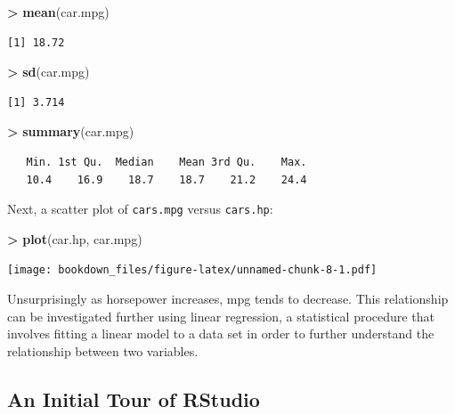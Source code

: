 \documentclass[]{krantz}
\makeatletter
\newenvironment{Shaded}{\begin{snugshade}}{\end{snugshade}}
\newcommand{\KeywordTok}[1]{\textcolor[rgb]{0.27,0.27,0.27}{\textbf{#1}}}
\newcommand{\StringTok}[1]{\textcolor[rgb]{0.5,0.5,0.5}{#1}}
\newcommand{\OperatorTok}[1]{\textcolor[rgb]{0.43,0.43,0.43}{\textbf{#1}}}
\newcommand{\NormalTok}[1]{#1}
\newenvironment{kframe}{%
\medskip{}
\setlength{\fboxsep}{.8em}
 \def\at@end@of@kframe{}%
 \ifinner\ifhmode%
  \def\at@end@of@kframe{\end{minipage}}%
  \begin{minipage}{\columnwidth}%
 \fi\fi%
 \def\FrameCommand##1{\hskip\@totalleftmargin \hskip-\fboxsep
 \colorbox{shadecolor}{##1}\hskip-\fboxsep
     \hskip-\linewidth \hskip-\@totalleftmargin \hskip\columnwidth}%
 \MakeFramed {\advance\hsize-\width
   \@totalleftmargin\z@ \linewidth\hsize
   \@setminipage}}%
 {\par\unskip\endMakeFramed%
 \at@end@of@kframe}
\renewenvironment{Shaded}{\begin{kframe}}{\end{kframe}}
\makeatother
\begin{document}
\begin{Shaded}
\begin{Highlighting}[]
\OperatorTok{>}\StringTok{ }\KeywordTok{mean}\NormalTok{(car.mpg)}
\end{Highlighting}
\end{Shaded}

\begin{verbatim}
[1] 18.72
\end{verbatim}

\begin{Shaded}
\begin{Highlighting}[]
\OperatorTok{>}\StringTok{ }\KeywordTok{sd}\NormalTok{(car.mpg)}
\end{Highlighting}
\end{Shaded}

\begin{verbatim}
[1] 3.714
\end{verbatim}

\begin{Shaded}
\begin{Highlighting}[]
\OperatorTok{>}\StringTok{ }\KeywordTok{summary}\NormalTok{(car.mpg)}
\end{Highlighting}
\end{Shaded}

\begin{verbatim}
   Min. 1st Qu.  Median    Mean 3rd Qu.    Max. 
   10.4    16.9    18.7    18.7    21.2    24.4 
\end{verbatim}

Next, a scatter plot of \texttt{cars.mpg} versus \texttt{cars.hp}:

\begin{Shaded}
\begin{Highlighting}[]
\OperatorTok{>}\StringTok{ }\KeywordTok{plot}\NormalTok{(car.hp, car.mpg)}
\end{Highlighting}
\end{Shaded}

\texttt{[image: bookdown\_files/figure-latex/unnamed-chunk-8-1.pdf]}

Unsurprisingly as horsepower increases, mpg tends to decrease. This
relationship can be investigated further using linear regression, a
statistical procedure that involves fitting a linear model to a data set
in order to further understand the relationship between two variables.

\subsection{An Initial Tour of
RStudio}\label{an-initial-tour-of-rstudio}
\end{document}
